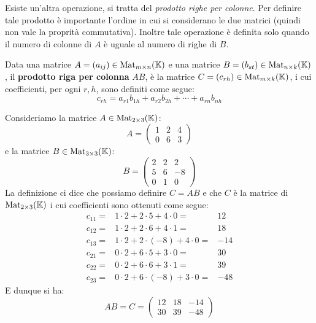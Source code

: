 Esiste un'altra operazione, si tratta del \emph{prodotto righe per colonne}. Per definire tale prodotto è
importante l'ordine in cui si considerano le due matrici (quindi non vale la proprità commutativa). Inoltre
tale operazione è definita solo quando il numero di colonne di $A$ è uguale al numero di righe di $B$.

\begin{definition}
	Data una matrice $A = (a_{ij}) \in \operatorname{Mat}_{m \times n} (\mathbb{K})$ e una matrice
	$B = (b_{st}) \in \operatorname{Mat}_{n \times k} (\mathbb{K})$, il \textbf{prodotto riga per colonna} $AB$, è la matrice
	$C = (c_{rh}) \in \operatorname{Mat}_{m \times k} (\mathbb{K})$, i cui coefficienti, per ogni $r, h$, sono definiti come
	segue:
	\[ c_{rh} = a_{r1} b_{1h} + a_{r2} b_{2h} + \cdots + a_{rn} b_{nh} \]
\end{definition}

\begin{example}
	Consideriamo la matrice $A \in \operatorname{Mat}_{2 \times 3}(\mathbb{K})$:
	\[
		A = \begin{pmatrix}
			1 & 2 & 4 \\
			0 & 6 & 3
		\end{pmatrix}
	\]
	e la matrice $B \in \operatorname{Mat}_{3 \times 3}(\mathbb{K})$:
	\[
		B = \begin{pmatrix}
			2 & 2 & 2  \\
			5 & 6 & -8 \\
			0 & 1 & 0
		\end{pmatrix}
	\]
	La definizione ci dice che possiamo definire $C = AB$ e che $C$ è la matrice di $\operatorname{Mat}_{2 \times 3}(\mathbb{K})$
	i cui coefficienti sono ottenuti come segue:
	\begin{align*}
		c_{11} = & 1 \cdot 2 + 2 \cdot 5 + 4 \cdot 0 =    & 12  \\
		c_{12} = & 1 \cdot 2 + 2 \cdot 6 + 4 \cdot 1 =    & 18  \\
		c_{13} = & 1 \cdot 2 + 2 \cdot (-8) + 4 \cdot 0 = & -14 \\
		c_{21} = & 0 \cdot 2 + 6 \cdot 5 + 3 \cdot 0 =    & 30  \\
		c_{22} = & 0 \cdot 2 + 6 \cdot 6 + 3 \cdot 1 =    & 39  \\
		c_{23} = & 0 \cdot 2 + 6 \cdot (-8) + 3 \cdot 0 = & -48
	\end{align*}
	E dunque si ha:
	\[
		AB = C = \begin{pmatrix}
			12 & 18 & -14 \\
			30 & 39 & -48
		\end{pmatrix}
	\]
\end{example}

